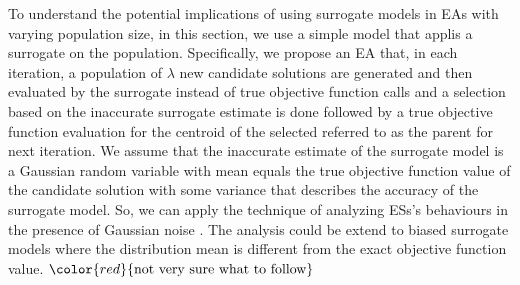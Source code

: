 To understand the potential implications of using surrogate models in EAs with varying population size, in this section, we use a simple model that applis a surrogate on the population. Specifically, we propose an EA that, in each iteration, a population of $\lambda$ new candidate solutions are generated and then evaluated by the surrogate instead of true objective function calls and a selection based on the inaccurate surrogate estimate is done followed by a true objective function evaluation for the centroid of the selected referred to as the parent for next iteration. We assume that the inaccurate estimate of the surrogate model is a Gaussian random variable with mean equals the true objective function value of the candidate solution with some variance that describes the accuracy of the surrogate model. So, we can apply the technique of analyzing ESs's behaviours in the presence of Gaussian noise \cite{arnold2002noisy}. The analysis could be extend to biased surrogate models where the distribution mean is different from the exact objective function value\cite{DBLP:conf/ppsn/KayhaniA18}. $\color{red}{\text{not very sure what to follow}}$ 

